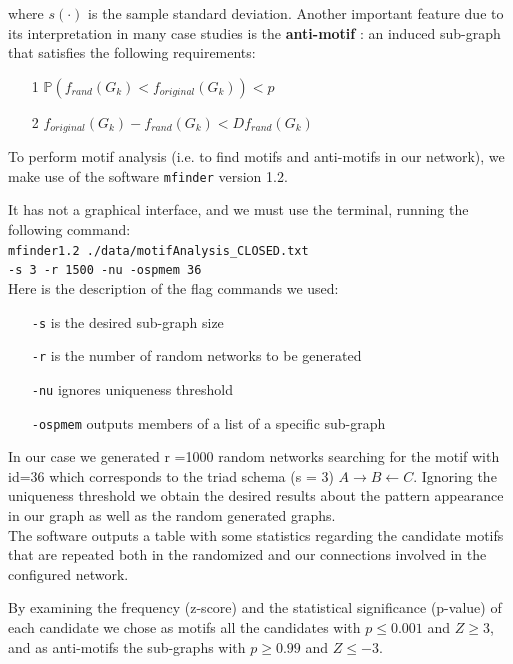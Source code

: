 \documentclass[%
 aip,
 jmp,%
 amsmath,amssymb,
 reprint,%
]{revtex4-1}
\begin{document}
where $s(\cdot)$ is the sample standard deviation. 
Another important feature due to its interpretation in many case studies is the \textbf{anti-motif} : an induced sub-graph that satisfies the following requirements:

\begin{itemize}
	\item[1] $\mathbb{P}(f_{rand}(G_k) < f_{original}(G_k)) < p$
	\item[2] $f_{original}(G_k)- f_{rand}(G_k) < D f_{rand}(G_k)$
\end{itemize}

To perform motif analysis (i.e. to find motifs and anti-motifs in our network), we make use of the software \verb|mfinder| version 1.2\cite{mfinder}.

It has not a graphical interface, and we must use the terminal, running the following command:\\

\verb|mfinder1.2 ./data/motifAnalysis_CLOSED.txt |\\

\verb|-s 3 -r 1500 -nu -ospmem 36|\\

Here is the description of the flag commands we used:
\begin{itemize}
	\item[] \verb|-s| is the desired sub-graph size
	\item[] \verb|-r| is the number of random networks to be generated
	\item[] \verb|-nu| ignores uniqueness threshold
	\item[] \verb|-ospmem| outputs members of a list of a specific sub-graph
\end{itemize}

In our case we generated r =1000 random networks searching for the motif with id=36 which corresponds to the triad schema (s = 3) $ A\rightarrow B \leftarrow C $. Ignoring the uniqueness threshold we obtain the desired results about the pattern appearance in our graph as well as the random generated graphs.\\

The software outputs a table with some statistics regarding the candidate motifs that are repeated both in the randomized and our connections involved in the configured network.

By examining the frequency (z-score) and the statistical significance (p-value) of each candidate we chose as motifs all the candidates with $ p \leq 0.001 $ and $ Z \geq 3$, and as anti-motifs the sub-graphs with $ p \geq 0.99 $ and $ Z \leq -3$.
\end{document}
